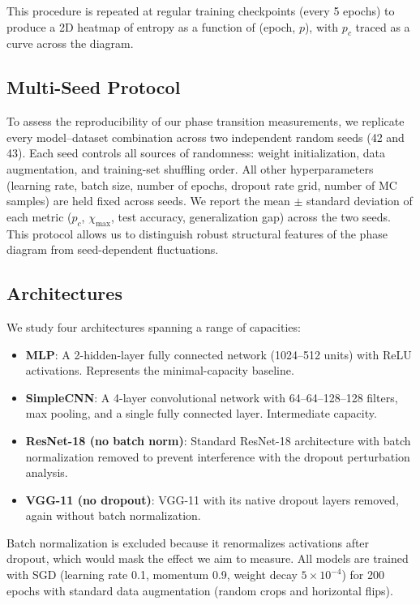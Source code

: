 \documentclass{article}
\begin{document}
This procedure is repeated at regular training checkpoints (every 5 epochs) to produce a 2D heatmap of entropy as a function of (epoch, $p$), with $p_c$ traced as a curve across the diagram.

\subsection{Multi-Seed Protocol}

To assess the reproducibility of our phase transition measurements, we replicate every model--dataset combination across two independent random seeds (42 and 43). Each seed controls all sources of randomness: weight initialization, data augmentation, and training-set shuffling order. All other hyperparameters (learning rate, batch size, number of epochs, dropout rate grid, number of MC samples) are held fixed across seeds. We report the mean $\pm$ standard deviation of each metric ($p_c$, $\chi_{\max}$, test accuracy, generalization gap) across the two seeds. This protocol allows us to distinguish robust structural features of the phase diagram from seed-dependent fluctuations.

\subsection{Architectures}

We study four architectures spanning a range of capacities:

\begin{itemize}
    \item \textbf{MLP}: A 2-hidden-layer fully connected network (1024--512 units) with ReLU activations. Represents the minimal-capacity baseline.
    \item \textbf{SimpleCNN}: A 4-layer convolutional network with 64--64--128--128 filters, max pooling, and a single fully connected layer. Intermediate capacity.
    \item \textbf{ResNet-18 (no batch norm)}: Standard ResNet-18 architecture \citep{he2016deep} with batch normalization removed to prevent interference with the dropout perturbation analysis.
    \item \textbf{VGG-11 (no dropout)}: VGG-11 \citep{simonyan2014very} with its native dropout layers removed, again without batch normalization.
\end{itemize}

Batch normalization is excluded because it renormalizes activations after dropout, which would mask the effect we aim to measure. All models are trained with SGD (learning rate 0.1, momentum 0.9, weight decay $5 \times 10^{-4}$) for 200 epochs with standard data augmentation (random crops and horizontal flips).
\end{document}
